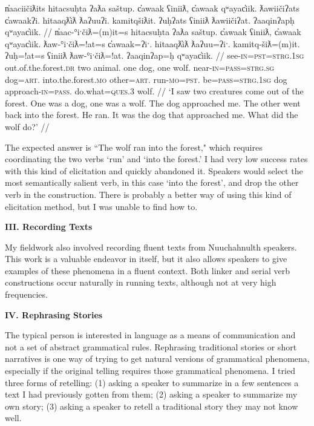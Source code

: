 \ex \label{ex:wolfsetup}
\begingl
\glpreamble n̓aaciičiƛits hitacsuḥta ʔaƛa saštup. c̓awaak ʕiniiƛ, c̓awaak qʷayac̓iik. ƛawiičiʔats c̓awaakʔi. hitaaqƛ̓iƛ ƛaʔuuʔi. kamitqšiƛit. ʔuḥʔats ʕiniiƛ ƛawiičiʔat. ʔaaqinʔapḥ qʷayac̓iik. //
\gla n̓aac-°iˑčiƛ=(m)it=s hitacsuḥta ʔaƛa saštup. c̓awaak ʕiniiƛ, c̓awaak qʷayac̓iik. ƛaw-°iˑčiƛ=!at=s c̓awaak=ʔiˑ. hitaaqƛ̓iƛ ƛaʔuu=ʔiˑ. kamitq-šiƛ=(m)it. ʔuḥ=!at=s ʕiniiƛ ƛaw-°iˑčiƛ=!at. ʔaaqinʔap=ḥ qʷayac̓iik. //
\glb see-\textsc{in}=\textsc{pst}=\textsc{strg.1sg} out.of.the.forest.\textsc{dr} two animal. one dog, one wolf. near-\textsc{in}=\textsc{pass}=\textsc{strg.sg} dog=\textsc{art}. into.the.forest.\textsc{mo} other=\textsc{art}. run-\textsc{mo}=\textsc{pst}. be=\textsc{pass}=\textsc{strg.1sg} dog approach-\textsc{in}=\textsc{pass}. do.what=\textsc{ques.3} wolf. //
\glft `I saw two creatures come out of the forest. One was a dog, one was a wolf. The dog approached me. The other went back into the forest. He ran. It was the dog that approached me. What did the wolf do?' //
\endgl
\xe

The expected answer is ``The wolf ran into the forest," which requires coordinating the two verbs `run' and `into the forest.' I had very low success rates with this kind of elicitation and quickly abandoned it. Speakers would select the most semantically salient verb, in this case `into the forest', and drop the other verb in the construction. There is probably a better way of using this kind of elicitation method, but I was unable to find how to.

\vspace{8pt}

\noindent \textbf{III. Recording Texts}

My fieldwork also involved recording fluent texts from Nuuchahnulth speakers. This work is a valuable endeavor in itself, but it also allows speakers to give examples of these phenomena in a fluent context. Both linker and serial verb constructions occur naturally in running texts, although not at very high frequencies.

\vspace{8pt}

\noindent \textbf{IV. Rephrasing Stories}

The typical person is interested in language as a means of communication and not a set of abstract grammatical rules. Rephrasing traditional stories or short narratives is one way of trying to get natural versions of grammatical phenomena, especially if the original telling requires those grammatical phenomena. I tried three forms of retelling: (1) asking a speaker to summarize in a few sentences a text I had previously gotten from them; (2) asking a speaker to summarize my own story; (3) asking a speaker to retell a traditional story they may not know well.

